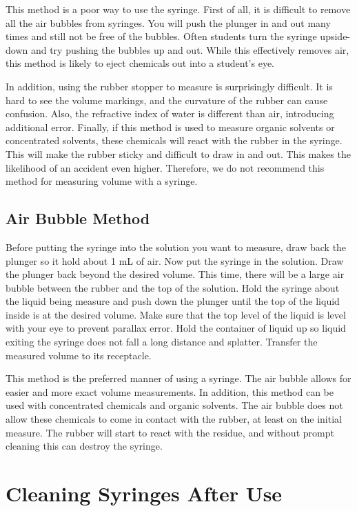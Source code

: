 This method is a poor way to use the syringe. First of all, it is difficult to remove all the air bubbles from syringes. You will push the plunger in and out many times and still not be free of the bubbles. Often students turn the syringe upside-down and try pushing the bubbles up and out. While this effectively removes air, this method is likely to eject chemicals out into a student’s eye. 

In addition, using the rubber stopper to measure is surprisingly difficult. It is hard to see the volume markings, and the curvature of the rubber can cause confusion. Also, the refractive index of water is different than air, introducing additional error. Finally, if this method is used to measure organic solvents or concentrated solvents, these chemicals will react with the rubber in the syringe. This will make the rubber sticky and difficult to draw in and out. This makes the likelihood of an accident even higher. Therefore, we do not recommend this method for measuring volume with a syringe.

\subsection{Air Bubble Method}
Before putting the syringe into the solution you want to measure, draw back the plunger so it hold about 1 mL of air. Now put the syringe in the solution. Draw the plunger back beyond the desired volume. This time, there will be a large air bubble between the rubber and the top of the solution. Hold the syringe about the liquid being measure and push down the plunger until the top of the liquid inside is at the desired volume. Make sure that the top level of the liquid is level with your eye to prevent parallax error. Hold the container of liquid up so liquid exiting the syringe does not fall a long distance and splatter. Transfer the measured volume to its receptacle. 

This method is the preferred manner of using a syringe. The air bubble allows for easier and more exact volume measurements. In addition, this method can be used with concentrated chemicals and organic solvents. The air bubble does not allow these chemicals to come in contact with the rubber, at least on the initial measure. The rubber will start to react with the residue, and without prompt cleaning this can destroy the syringe.
 
\section{Cleaning Syringes After Use}

